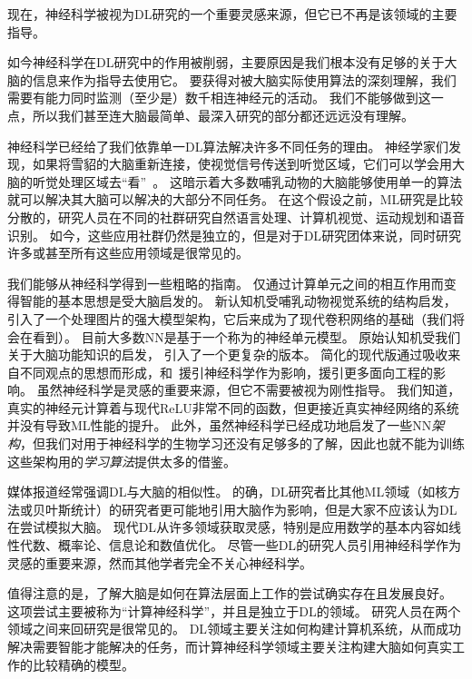 现在，神经科学被视为\gls{DL}研究的一个重要灵感来源，但它已不再是该领域的主要指导。


如今神经科学在\gls{DL}研究中的作用被削弱，主要原因是我们根本没有足够的关于大脑的信息来作为指导去使用它。
要获得对被大脑实际使用算法的深刻理解，我们需要有能力同时监测（至少是）数千相连神经元的活动。
我们不能够做到这一点，所以我们甚至连大脑最简单、最深入研究的部分都还远远没有理解\citep{olshausen:2005}。

神经科学已经给了我们依靠单一\gls{DL}算法解决许多不同任务的理由。
神经学家们发现，如果将雪貂的大脑重新连接，使视觉信号传送到听觉区域，它们可以学会用大脑的听觉处理区域去``看''~\citep{von2000visual}。
这暗示着大多数哺乳动物的大脑能够使用单一的算法就可以解决其大脑可以解决的大部分不同任务。
在这个假设之前，\gls{ML}研究是比较分散的，研究人员在不同的社群研究自然语言处理、计算机视觉、运动规划和语音识别。
如今，这些应用社群仍然是独立的，但是对于\gls{DL}研究团体来说，同时研究许多或甚至所有这些应用领域是很常见的。

我们能够从神经科学得到一些粗略的指南。
仅通过计算单元之间的相互作用而变得智能的基本思想是受大脑启发的。
新认知机\citep{Fukushima80}受哺乳动物视觉系统的结构启发，引入了一个处理图片的强大模型架构，它后来成为了现代卷积网络的基础\citep{LeCun98-small}（我们将会在看到）。
目前大多数\gls{NN}是基于一个称为的神经单元模型。
原始认知机\citep{Fukushima75}受我们关于大脑功能知识的启发， 引入了一个更复杂的版本。
简化的现代版通过吸收来自不同观点的思想而形成，\citet{Nair-2010}和~\citet{Glorot+al-AI-2011-small}援引神经科学作为影响，\citet{Jarrett-ICCV2009}援引更多面向工程的影响。
虽然神经科学是灵感的重要来源，但它不需要被视为刚性指导。
我们知道，真实的神经元计算着与现代\gls{ReLU}非常不同的函数，但更接近真实神经网络的系统并没有导致\gls{ML}性能的提升。
此外，虽然神经科学已经成功地启发了一些\gls{NN}\emph{架构}，但我们对用于神经科学的生物学习还没有足够多的了解，因此也就不能为训练这些架构用的\emph{学习算法}提供太多的借鉴。


媒体报道经常强调\gls{DL}与大脑的相似性。
的确，\gls{DL}研究者比其他\gls{ML}领域（如核方法或贝叶斯统计）的研究者更可能地引用大脑作为影响，但是大家不应该认为\gls{DL}在尝试模拟大脑。
现代\gls{DL}从许多领域获取灵感，特别是应用数学的基本内容如线性代数、概率论、信息论和数值优化。
尽管一些\gls{DL}的研究人员引用神经科学作为灵感的重要来源，然而其他学者完全不关心神经科学。


值得注意的是，了解大脑是如何在算法层面上工作的尝试确实存在且发展良好。
这项尝试主要被称为``计算神经科学''，并且是独立于\gls{DL}的领域。
研究人员在两个领域之间来回研究是很常见的。
\gls{DL}领域主要关注如何构建计算机系统，从而成功解决需要智能才能解决的任务，而计算神经科学领域主要关注构建大脑如何真实工作的比较精确的模型。

